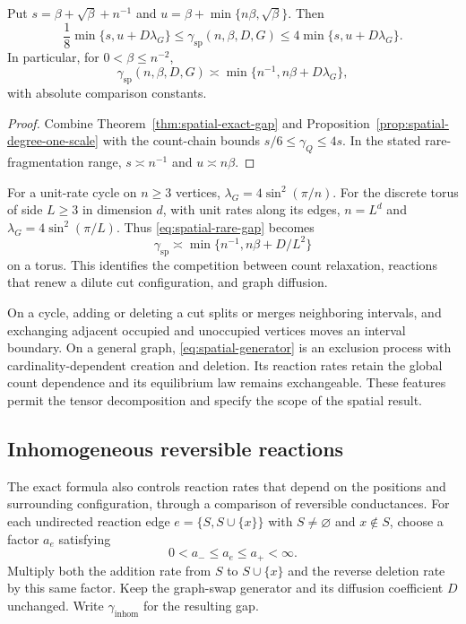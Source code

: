 \begin{corollary}
\label{cor:spatial-uniform-gap}
Put $s=\beta+\sqrt\beta+n^{-1}$ and
$u=\beta+\min\{n\beta,\sqrt\beta\}$.  Then
\begin{equation}\label{eq:spatial-uniform-gap}
 \frac18\min\{s,u+D\lambda_G\}
 \leq\gamma_{\mathrm{sp}}(n,\beta,D,G)
 \leq4\min\{s,u+D\lambda_G\}.
\end{equation}
In particular, for $0<\beta\leq n^{-2}$,
\begin{equation}\label{eq:spatial-rare-gap}
 \gamma_{\mathrm{sp}}(n,\beta,D,G)
 \asymp\min\{n^{-1},n\beta+D\lambda_G\},
\end{equation}
with absolute comparison constants.
\end{corollary}

\begin{proof}
Combine Theorem~\ref{thm:spatial-exact-gap} and
Proposition~\ref{prop:spatial-degree-one-scale} with the count-chain
bounds $s/6\leq\gamma_Q\leq4s$.  In the stated rare-fragmentation
range, $s\asymp n^{-1}$ and $u\asymp n\beta$.
\end{proof}

For a unit-rate cycle on $n\geq3$ vertices,
$\lambda_G=4\sin^2(\pi/n)$.  For the discrete torus of side
$L\geq3$ in dimension $d$, with unit rates along its edges,
$n=L^d$ and $\lambda_G=4\sin^2(\pi/L)$.  Thus
\eqref{eq:spatial-rare-gap} becomes
\[
 \gamma_{\mathrm{sp}}
 \asymp\min\{n^{-1},n\beta+D/L^2\}
\]
on a torus.  This identifies the competition between count relaxation,
reactions that renew a dilute cut configuration, and graph diffusion.

On a cycle, adding or deleting a cut splits or merges neighboring
intervals, and exchanging adjacent occupied and unoccupied vertices
moves an interval boundary.  On a general graph,
\eqref{eq:spatial-generator} is an exclusion process with
cardinality-dependent creation and deletion.  Its reaction rates
retain the global count dependence and its equilibrium law remains
exchangeable.  These features permit the tensor decomposition and
specify the scope of the spatial result.

\subsection{Inhomogeneous reversible reactions}

The exact formula also controls reaction rates that depend on the
positions and surrounding configuration, through a comparison of
reversible conductances.  For each undirected reaction edge
$e=\{S,S\cup\{x\}\}$ with $S\neq\varnothing$ and $x\notin S$,
choose a factor $a_e$ satisfying
\[
 0<a_-\leq a_e\leq a_+<\infty.
\]
Multiply both the addition rate from $S$ to $S\cup\{x\}$ and the
reverse deletion rate by this same factor.  Keep the graph-swap
generator and its diffusion coefficient $D$ unchanged.  Write
$\gamma_{\mathrm{inhom}}$ for the resulting gap.

